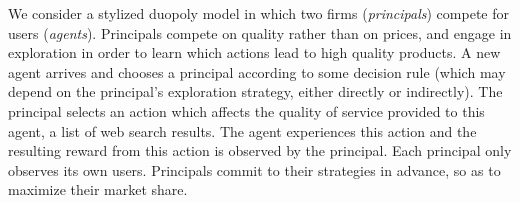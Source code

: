 






 We consider a stylized duopoly model in which two firms (\emph{principals}) compete for users (\emph{agents}). Principals compete on quality rather than on prices, and engage in exploration in order to learn which actions lead to high quality products. A new agent arrives and chooses a principal according to some decision rule (which may depend on the principal's exploration strategy, either directly or indirectly). The principal selects an action which affects the quality of service provided to this agent, \eg a list of web search results. The agent experiences this action and the resulting reward from this action is observed by the principal. Each principal only observes its own users. Principals commit to their strategies in advance, so as to maximize their market share.




